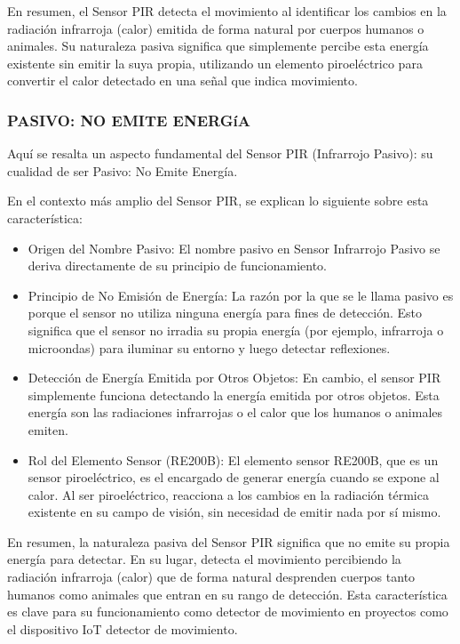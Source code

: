 \documentclass{report}
\begin{document}
En resumen, el Sensor PIR detecta el movimiento al identificar los cambios en la radiación infrarroja (calor) emitida de forma natural por cuerpos humanos 
o animales. Su naturaleza pasiva significa que simplemente percibe esta energía existente sin emitir la suya propia, utilizando un elemento piroeléctrico 
para convertir el calor detectado en una señal que indica movimiento.

\subsubsection{PASIVO: NO EMITE ENERGíA}
Aquí se resalta un aspecto fundamental del Sensor PIR (Infrarrojo Pasivo): su cualidad de ser 
Pasivo: No Emite Energía.

En el contexto más amplio del Sensor PIR, se  explican lo siguiente sobre esta característica:
\begin{itemize}
    \item Origen del Nombre Pasivo: El nombre pasivo en Sensor Infrarrojo Pasivo se deriva directamente de su principio de funcionamiento.
    \item Principio de No Emisión de Energía: La razón por la que se le llama pasivo es porque el sensor no utiliza ninguna energía para fines de detección. 
    Esto significa que el sensor no irradia su propia energía (por ejemplo, infrarroja o microondas) para iluminar su entorno y luego detectar reflexiones.
    \item Detección de Energía Emitida por Otros Objetos: En cambio, el sensor PIR simplemente funciona detectando la energía emitida por otros objetos. 
    Esta energía son las radiaciones infrarrojas o el calor que los humanos o animales emiten.
    \item Rol del Elemento Sensor (RE200B): El elemento sensor RE200B, que es un sensor piroeléctrico, es el encargado de generar energía cuando se expone 
    al calor. Al ser piroeléctrico, reacciona a los cambios en la radiación térmica existente en su campo de visión, sin necesidad de emitir nada por sí mismo. 
\end{itemize}

En resumen, la naturaleza pasiva del Sensor PIR significa que no emite su propia energía para detectar. En su lugar, detecta el movimiento percibiendo 
la radiación infrarroja (calor) que de forma natural desprenden cuerpos tanto humanos como animales que entran en su rango de detección. 
Esta característica es clave para su funcionamiento como detector de movimiento en proyectos como el dispositivo IoT detector de movimiento.
\end{document}
